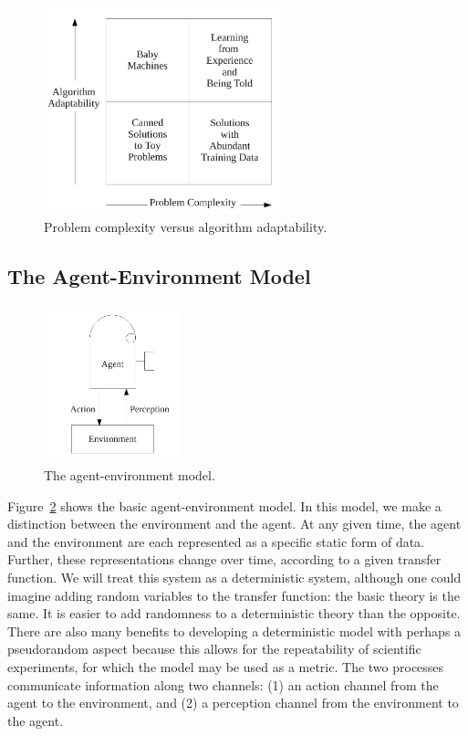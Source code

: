 \begin{figure}[bth]
  \center
  \includegraphics[height=6cm]{gfx/problem_complexity_versus_algorithm_adaptability}
  \caption[Problem complexity versus algorithm adaptability]{Problem complexity versus algorithm adaptability.}
  \label{fig:problem_complexity_versus_algorithm_adaptability}
\end{figure}

\subsection{The Agent-Environment Model}

\begin{figure}[bth]
  \center
  \includegraphics[width=4cm]{gfx/agent_environment}
  \caption[The agent-environment model]{The agent-environment model.}
  \label{fig:agent_environment}
\end{figure}

Figure~\ref{fig:agent_environment} shows the basic agent-environment
model.  In this model, we make a distinction between the environment
and the agent.  At any given time, the agent and the environment are
each represented as a specific static form of data.  Further, these
representations change over time, according to a given transfer
function.  We will treat this system as a deterministic system,
although one could imagine adding random variables to the transfer
function: the basic theory is the same.  It is easier to add
randomness to a deterministic theory than the opposite.  There are
also many benefits to developing a deterministic model with perhaps a
pseudorandom aspect because this allows for the repeatability of
scientific experiments, for which the model may be used as a metric.
The two processes communicate information along two channels: (1) an
action channel from the agent to the environment, and (2) a perception
channel from the environment to the agent.





